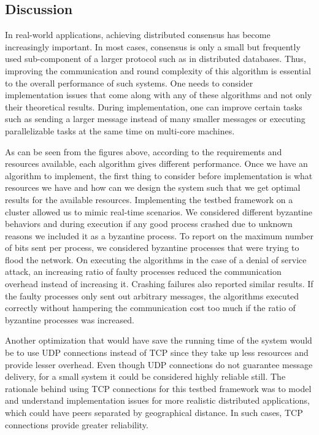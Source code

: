 ﻿

\subsection{Discussion}

In real-world applications, achieving distributed consensus has become increasingly important. In most cases, consensus is only a small but frequently used sub-component of a larger protocol such as in distributed databases. Thus, improving the communication and round complexity of this algorithm is essential to the overall performance of such systems. One needs to consider implementation issues that come along with any of these algorithms and not only their theoretical results. During implementation, one can improve certain tasks such as sending a larger message instead of many smaller messages or executing parallelizable tasks at the same time on multi-core machines.  

As can be seen from the figures above, according to the requirements and resources available, each algorithm gives different performance. Once we have an algorithm to implement, the first thing to consider before implementation is what resources we have and how can we design the system such that we get optimal results for the available resources. Implementing the testbed framework on a cluster allowed us to mimic real-time scenarios. We considered different byzantine behaviors and during execution if any good process crashed due to unknown reasons we included it as a byzantine process. To report on the maximum number of bits sent per process, we considered byzantine processes that were trying to flood the network. On executing the algorithms in the case of a denial of service attack, an increasing ratio of faulty processes reduced the communication overhead instead of increasing it. Crashing failures also reported similar results. If the faulty processes only sent out arbitrary messages, the algorithms executed correctly without hampering the communication cost too much if the ratio of byzantine processes was increased.

Another optimization that would have save the running time of the system would be to use UDP connections instead of TCP since they take up less resources and provide lesser overhead. Even though UDP connections do not guarantee message delivery, for a small system it could be considered highly reliable still. The rationale behind using TCP connections for this testbed framework was to model and understand implementation issues for more realistic distributed applications, which could have peers separated by geographical distance. In such cases, TCP connections provide greater reliability. 

